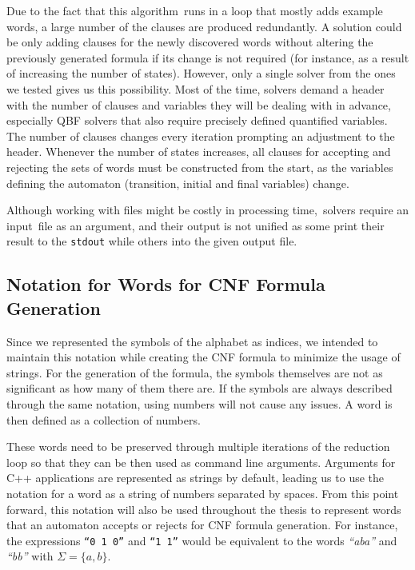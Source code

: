 Due to the fact that this algorithm runs in a loop that mostly adds example words, a large number of the clauses are produced redundantly.
A solution could be only adding clauses for the newly discovered words without altering the previously generated formula if its change is not required (for instance, as a result of increasing the number of states). However, only a single solver from the ones we tested gives us this possibility. Most of the time, solvers demand a header with the number of clauses and variables they will be dealing with in advance, especially QBF solvers that also require precisely defined quantified variables. The number of clauses changes every iteration prompting an adjustment to the header. Whenever the number of states increases, all clauses for accepting and rejecting the sets of words must be constructed from the start, as the variables defining the automaton (transition, initial and final variables) change.

Although working with files might be costly in processing time, solvers require an input file as an argument, and their output is not unified as some print their result to the \verb|stdout| while others into the given output file.

\subsection{Notation for Words for CNF Formula Generation}

Since we represented the symbols of the alphabet as indices, we intended to maintain this notation while creating the CNF formula to minimize the usage of strings. For the generation of the formula, the symbols themselves are not as significant as how many of them there are. If the symbols are always described through the same notation, using numbers will not cause any issues. A word is then defined as a collection of numbers. 

These words need to be preserved through multiple iterations of the reduction loop so that they can be then used as command line arguments. Arguments for C++ applications are represented as strings by default, leading us to use the notation for a word as a string of numbers separated by spaces. From this point forward, this notation will also be used throughout the thesis to represent words that an automaton accepts or rejects for CNF formula generation. For instance, the expressions \texttt{``0 1 0''} and \texttt{``1 1''} would be equivalent to the words \textit{``aba''} and \textit{``bb''} with $\Sigma=\{a,b\}$.

